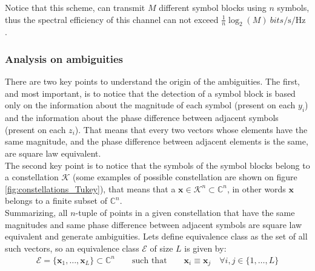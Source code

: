Notice that this scheme, can transmit $M$ different symbol blocks using $n$ symbols, thus the spectral efficiency of this channel can not exceed $\frac{1}{n}\log_2(M)\SI{}{bits/\s/\Hz}$ \cite{Tasbihi_Tukey}.

\subsubsection{Analysis on ambiguities}

There are two key points to understand the origin of the ambiguities. The first, and most important, is to notice that the detection of a symbol block is based only on the information about the magnitude of each symbol (present on each $y_i$) and the information about the phase difference between adjacent symbols (present on each $z_i$). That means that every two vectors whose elements have the same magnitude, and the phase difference between adjacent elements is the same, are square law equivalent.\\

The second key point is to notice that the symbols of the symbol blocks belong to a constellation $\mathcal K$ (some examples of possible constellation are shown on figure \ref{fig:constellations_Tukey}), that means that a $\bm x\in \mathcal K^n \subset\mathds{C}^n$, in other words $\bm x$ belongs to a finite subset of $\mathds{C}^n$.\\

Summarizing, all $n$-tuple of points in a given constellation that have the same magnitudes and same phase difference between adjacent symbols are square law equivalent and generate ambiguities. Lets define equivalence class as the set of all such vectors, so an equivalence class $\mathcal{E}$ of size $L$ is given by:
\begin{align}
	\mathcal E=\{\bm x_1, \dotsc,\bm x_L\} \subset\mathds C^n\qquad \text{such that}\qquad\bm x_i\equiv\bm x_j\quad \forall i,j \in \{1,\dotsc,L\} 
\end{align}


